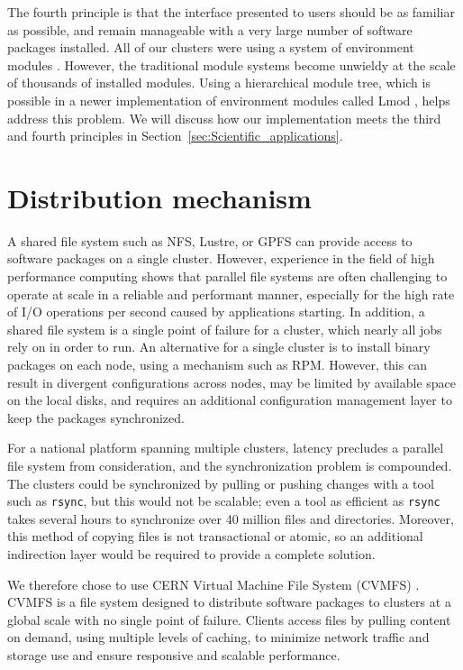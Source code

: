 \documentclass[sigconf]{acmart}
\begin{document}
The fourth principle is that the interface presented to users should be as familiar as possible, and remain manageable with a very large number of software packages installed. All of our clusters were using a system of environment modules \cite{Modules1991,Modules1996}. However, the traditional module systems become unwieldy at the scale of thousands of installed modules. Using a hierarchical module tree, which is possible in a newer implementation of environment modules called Lmod \cite{Lmod}, helps address this problem. We will discuss how our implementation meets the third and fourth principles in Section~\ref{sec:Scientific_applications}.

\section{Distribution mechanism}
\label{sec:Distribution_mechanism}
A shared file system such as NFS, Lustre, or GPFS can provide access to software packages on a single cluster. However, experience in the field of high performance computing shows that parallel file systems are often challenging to operate at scale in a reliable and performant manner, especially for the high rate of I/O operations per second caused by applications starting. In addition, a shared file system is a single point of failure for a cluster, which nearly all jobs rely on in order to run. An alternative for a single cluster is to install binary packages on each node, using a mechanism such as RPM. However, this can result in divergent configurations across nodes, may be limited by available space on the local disks, and requires an additional configuration management layer to keep the packages synchronized. 

For a national platform spanning multiple clusters, latency precludes a parallel file system from consideration, and the synchronization problem is compounded. The clusters could be synchronized by pulling or pushing changes with a tool such as \texttt{rsync}, but this would not be scalable; even a tool as efficient as \texttt{rsync} takes several hours to synchronize over 40 million files and directories. Moreover, this method of copying files is not transactional or atomic, so an additional indirection layer would be required to provide a complete solution.

We therefore chose to use CERN Virtual Machine File System (CVMFS) \cite{CVMFS,CVMFS2012}. CVMFS is a file system designed to distribute software packages to clusters at a global scale with no single point of failure. Clients access files by pulling content on demand, using multiple levels of caching, to minimize network traffic and storage use and ensure responsive and scalable performance.
\end{document}

